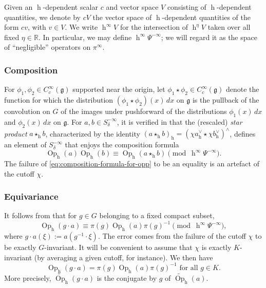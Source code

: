 \documentclass[reqno,10pt]{amsart}
\theoremstyle{plain} %
\theoremstyle{definition}
\theoremstyle{plain} %
\theoremstyle{remark}
\theoremstyle{itplain} %
\theoremstyle{remark} %
\numberwithin{equation}{section}
\DeclareMathOperator{\Opp}{Op}
\DeclareMathOperator{\h}{h}
\begin{document}
Given an $\h$-dependent scalar $c$ and vector space $V$ consisting of $\h$-dependent quantities, we denote by $c V$ the vector space of $\h$-dependent quantities of the form $c v$, with $v \in V$.  We write $\h^\infty V$ for the intersection of $\h^\eta V$ taken over all fixed $\eta \in \mathbb{R}$.  In particular, we may define $\h^\infty \Psi^{-\infty}$; we will regard it as the space of ``negligible'' operators on $\pi^\infty$.

\subsubsection{Composition}\label{sec:35ac3e576a}
For $\phi_1, \phi_2 \in C_c^\infty(\mathfrak{g})$ supported near the origin, let $\phi_1 \star \phi_2 \in C_c^\infty(\mathfrak{g})$ denote the function for which the distribution $(\phi_1 \star \phi_2)(x) \, d x$ on $\mathfrak{g}$ is the pullback of the convolution on $G$ of the images under pushforward of the distributions $\phi_1(x) \, d x$ and $\phi_2(x) \, d x$ on $\mathfrak{g}$.  For $a, b \in S^{-\infty}_{\delta}$, it is verified in \cite[\S2.5, \S4.6]{nelson-venkatesh-1} that the (rescaled) \emph{star product} $a \star_{\h} b$, characterized by the identity $(a \star_{\h} b)_{\h} = (\chi a_{\h}^\vee \star \chi b_{\h}^\vee)^\wedge$, defines an element of $S^{-\infty}_\delta$ that enjoys the composition formula
\begin{equation}\label{eq:composition-formula-for-opp}
  \Opp_{\h}(a)
  \Opp_{\h}(b)
  \equiv 
  \Opp_{\h}(a \star_{\h} b)
  \pmod{\h^\infty \Psi^{-\infty}}.
\end{equation}
The failure of \eqref{eq:composition-formula-for-opp} to be an equality is an artefact of the cutoff $\chi$.

\subsubsection{Equivariance}\label{sec:35ac3e576c}
It follows from \cite[\S5.5]{nelson-venkatesh-1} that for $g \in G$ belonging to a fixed compact subset,
\begin{equation}\label{eq:opp-equivariance}
  \Opp_{\h}(g \cdot a)
  \equiv
  \pi(g)
  \Opp_{\h}(a)
  \pi(g)^{-1}
  \pmod{\h^\infty \Psi^{-\infty}},
\end{equation}
where $g \cdot a(\xi) := a(g^{-1} \cdot \xi)$.  The error comes from the failure of the cutoff $\chi$ to be exactly $G$-invariant.  It will be convenient to assume that $\chi$ is exactly $K$-invariant (by averaging a given cutoff, for instance).  We then have
\begin{equation}\label{eq:exact-equivariance-K}
  \Opp_{\h}(g \cdot a)
  =
  \pi(g)
  \Opp_{\h}(a)
  \pi(g)^{-1}
  \text{ for all } g \in K.
\end{equation}
More precisely, $\widetilde{\Opp}_{\h}(g \cdot a)$ is the conjugate by $g$ of $\widetilde{\Opp}_{\h}(a)$.
\end{document}

